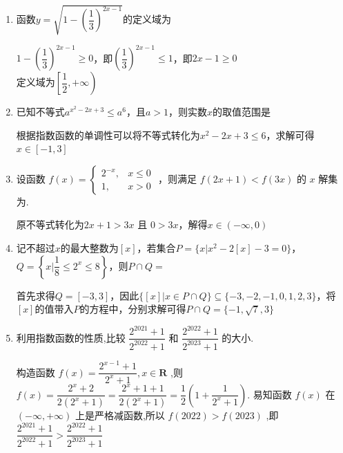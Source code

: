 \begin{enumerate}
    \item 函数$y = \sqrt{1-\left(\dfrac{1}{3}\right)^{2x-1}}$的定义域为\blkda{$\left[\dfrac{1}{2}, +\infty\right)$}
    \begin{jieda}
        $1-\left(\dfrac{1}{3}\right)^{2x-1} \geq 0$，即$\left(\dfrac{1}{3}\right)^{2x-1} \leq 1$，即$2x-1 \geq 0$ \\
        定义域为$\left[\dfrac{1}{2}, +\infty\right)$
    \end{jieda}
    \item 已知不等式$a^{x^2-2x+3} \leq a^6$，且$a > 1$，则实数$x$的取值范围是\blkda{$[-1, 3]$}
    \begin{jieda}
        根据指数函数的单调性可以将不等式转化为$x^2-2x+3 \leq 6$，求解可得$x \in [-1, 3]$
    \end{jieda}
    \item 设函数 $f(x)=\left\{\begin{array}{ll}2^{-x}, & x \leq 0 \\ 1, & x>0\end{array}\right.$ ，则满足 $f(2 x+1)<f(3 x)$ 的 $x$ 解集为.
    \begin{jieda}
        原不等式转化为$2x+1 > 3x$ 且 $0 > 3x$，解得$x \in (-\infty, 0)$
    \end{jieda}
    \item 记不超过$x$的最大整数为$[x]$，若集合$P = \{x | x^2 - 2[x] - 3 = 0\}$，$Q = \left\{x | \dfrac{1}{8} \leq 2^x \leq 8 \right\}$，则$P \cap Q = $
    \begin{jieda}
        首先求得$Q = [-3, 3]$，因此$\{[x] | x \in P \cap Q \} \subseteq \{-3, -2, -1, 0, 1, 2, 3\}$，将$[x]$的值带入$P$的方程中，分别求解可得$P \cap Q = \{-1, \sqrt{7}, 3\}$
    \end{jieda}
    \item 利用指数函数的性质,比较 $\dfrac{{2}^{2021} + 1}{{2}^{2022} + 1}$ 和 $\dfrac{{2}^{2022} + 1}{{2}^{2023} + 1}$ 的大小.
    \begin{jieda}
        构造函数 $f\left( x\right)  = \dfrac{{2}^{x - 1} + 1}{{2}^{x} + 1},x \in  \mathbf{R}$ ,则
        $f\left( x\right)  = \dfrac{{2}^{x} + 2}{2\left( {{2}^{x} + 1}\right) } = \dfrac{{2}^{x} + 1 + 1}{2\left( {{2}^{x} + 1}\right) } = \dfrac{1}{2}\left( {1 + \dfrac{1}{{2}^{x} + 1}}\right) .$
        易知函数 $f\left( x\right)$ 在 $\left( {-\infty , + \infty }\right)$ 上是严格减函数,所以 $f\left( {2022}\right)  > f\left( {2023}\right)$ ,即
        $\dfrac{{2}^{2021} + 1}{{2}^{2022} + 1} > \dfrac{{2}^{2022} + 1}{{2}^{2023} + 1}$
    \end{jieda}

\end{enumerate}
